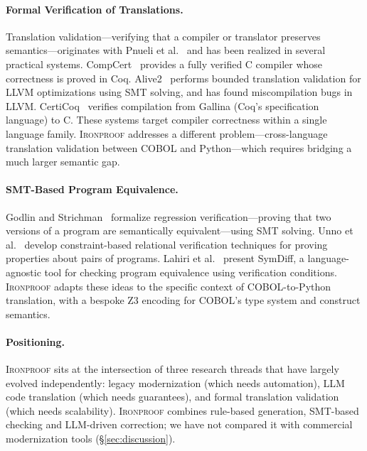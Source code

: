 \documentclass[sigconf,nonacm]{acmart}
\begin{document}
\paragraph{Formal Verification of Translations.} Translation validation---verifying that a compiler or translator preserves semantics---originates with Pnueli et al.~\cite{pnueli1998translation} and has been realized in several practical systems. CompCert~\cite{leroy2009compcert} provides a fully verified C compiler whose correctness is proved in Coq. Alive2~\cite{lopes2021alive2} performs bounded translation validation for LLVM optimizations using SMT solving, and has found miscompilation bugs in LLVM. CertiCoq~\cite{anand2017certicoq} verifies compilation from Gallina (Coq's specification language) to C. These systems target compiler correctness within a single language family. \textsc{Ironproof} addresses a different problem---cross-language translation validation between COBOL and Python---which requires bridging a much larger semantic gap.

\paragraph{SMT-Based Program Equivalence.} Godlin and Strichman~\cite{godlin2009regression} formalize regression verification---proving that two versions of a program are semantically equivalent---using SMT solving. Unno et al.~\cite{unno2021constraint} develop constraint-based relational verification techniques for proving properties about pairs of programs. Lahiri et al.~\cite{lahiri2012symdiff} present SymDiff, a language-agnostic tool for checking program equivalence using verification conditions. \textsc{Ironproof} adapts these ideas to the specific context of COBOL-to-Python translation, with a bespoke Z3 encoding for COBOL's type system and construct semantics.

\paragraph{Positioning.} \textsc{Ironproof} sits at the intersection of three research threads that have largely evolved independently: legacy modernization (which needs automation), LLM code translation (which needs guarantees), and formal translation validation (which needs scalability). \textsc{Ironproof} combines rule-based generation, SMT-based checking and LLM-driven correction; we have not compared it with commercial modernization tools (\S\ref{sec:discussion}).
\end{document}

